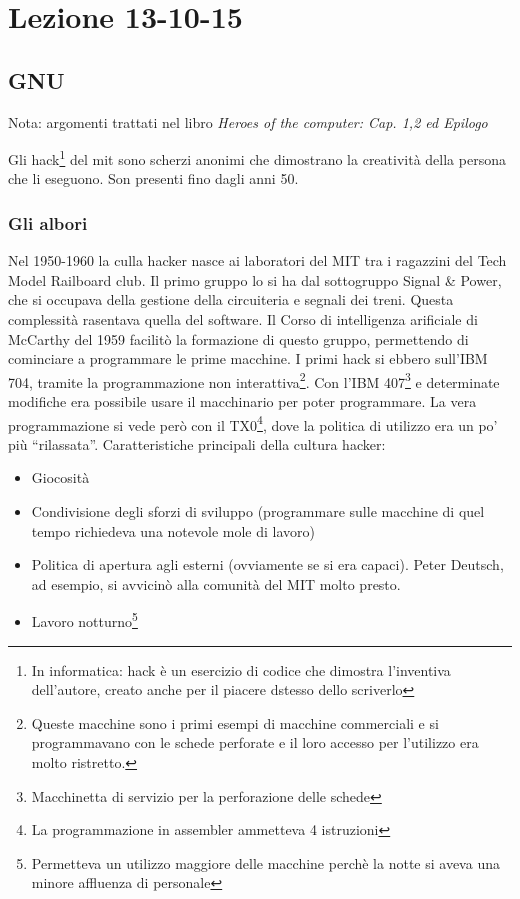 \section{Lezione 13-10-15}

\subsection{GNU}

Nota: argomenti trattati nel libro \textit{Heroes of the computer: Cap. 1,2 ed Epilogo}

Gli hack\footnote{In informatica: hack \`e un esercizio di codice che dimostra l'inventiva dell'autore, creato anche per il piacere dstesso dello scriverlo} del mit sono scherzi anonimi che dimostrano la creativit\`a della persona che li eseguono. Son presenti fino dagli anni 50.

\subsubsection{Gli albori}

Nel 1950-1960 la culla hacker nasce ai laboratori del MIT tra i ragazzini del Tech Model Railboard club. Il primo gruppo lo si ha dal sottogruppo Signal \& Power, che si occupava della gestione della circuiteria e segnali dei treni. Questa complessit\`a rasentava quella del software. Il Corso di intelligenza arificiale di McCarthy del 1959 facilit\`o la formazione di questo gruppo, permettendo di cominciare a programmare le prime macchine. I primi hack si ebbero sull'IBM 704, tramite la programmazione non interattiva\footnote{Queste macchine sono i primi esempi di macchine commerciali e si programmavano con le schede perforate e il loro accesso per l'utilizzo era molto ristretto.}. Con l'IBM 407\footnote{Macchinetta di servizio per la perforazione delle schede} e determinate modifiche era possibile usare il macchinario per poter programmare. La vera programmazione si vede per\`o con il TX0\footnote{La programmazione in assembler ammetteva 4 istruzioni}, dove la politica di utilizzo era un po' pi\`u ``rilassata''.
Caratteristiche principali della cultura hacker:
\begin{itemize}

\item Giocosit\`a
\item Condivisione degli sforzi di sviluppo (programmare sulle macchine di quel tempo richiedeva una notevole mole di lavoro)
\item Politica di apertura agli esterni (ovviamente se si era capaci). Peter Deutsch, ad esempio, si avvicin\`o alla comunit\`a del MIT molto presto.
\item Lavoro notturno\footnote{Permetteva un utilizzo maggiore delle macchine perch\`e la notte si aveva una minore affluenza di personale}

\end{itemize}

